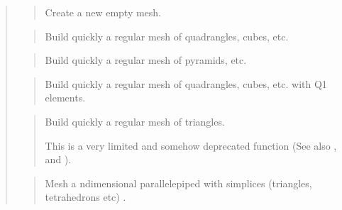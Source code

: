 \documentclass[a4paper,11pt,english]{sphinxmanual}
\begin{document}
\begin{quote}

\begin{quote}

Create a new empty mesh.
\end{quote}

\begin{quote}

Build quickly a regular mesh of quadrangles, cubes, etc.
\end{quote}

\begin{quote}

Build quickly a regular mesh of pyramids, etc.
\end{quote}

\begin{quote}

Build quickly a regular mesh of quadrangles, cubes, etc. with
Q1 elements.
\end{quote}

\begin{quote}

Build quickly a regular mesh of triangles.

This is a very limited and somehow deprecated function (See also
,  and
).
\end{quote}

\begin{quote}

Mesh a n\sphinxhyphen{}dimensional parallelepiped with simplices (triangles,
tetrahedrons etc) .


\end{quote}
\end{quote}
\end{document}
